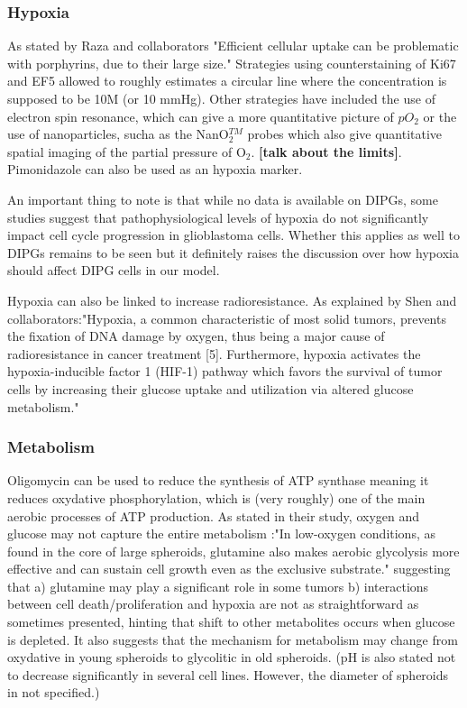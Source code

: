 \documentclass[11pt,a4paper]{article}
\begin{document}
\subsubsection{Hypoxia}
As stated by Raza and collaborators "Efficient cellular uptake can be problematic with porphyrins, due to their large size."\cite{Raza2017} Strategies using counterstaining of Ki67 and EF5 allowed to roughly estimates a circular line where the concentration is supposed to be 10\textmu M (or 10 mmHg)\cite{Grimes2014}\cite{Mao2018}. Other strategies have included the use of electron spin resonance\cite{Hashem2015}, which can give a more quantitative picture of $pO_2$ or the use of nanoparticles, sucha as the NanO$_2^{TM}$ probes which also give quantitative spatial imaging of the partial pressure of O$_2$.\cite{Dmitriev2014} \textbf{[talk about the limits]}. Pimonidazole can also be used  as an hypoxia marker. \cite{Onozato2017}

An important thing to note is that while no data is available on DIPGs, some studies suggest that pathophysiological levels of hypoxia do not significantly impact cell cycle progression in glioblastoma cells. Whether this applies as well to DIPGs remains to be seen but it definitely raises the discussion over how hypoxia should affect DIPG cells in our model.

Hypoxia can also be linked to increase radioresistance. As explained by Shen and collaborators:"Hypoxia, a common characteristic of most solid tumors, prevents the fixation of DNA damage by oxygen, thus being a major cause of radioresistance in cancer treatment [5]. Furthermore, hypoxia activates the hypoxia-inducible factor 1 (HIF-1) pathway which favors the survival of tumor cells by increasing their glucose uptake and utilization via altered glucose metabolism."\cite{Shen2020}

\subsubsection{Metabolism}
Oligomycin can be used to reduce the synthesis of ATP synthase meaning it reduces oxydative phosphorylation, which is (very roughly) one of the main aerobic processes of ATP production.\cite{Tidwell2022} As stated  in their study, oxygen and glucose may not capture the entire metabolism :"In low-oxygen conditions, as found in the core of large spheroids, glutamine also makes aerobic glycolysis more effective and can sustain cell growth even as the exclusive substrate." suggesting that a) glutamine may play a significant role in some tumors b) interactions between cell death/proliferation and hypoxia are not as straightforward as sometimes presented, hinting that shift to other metabolites occurs when glucose is depleted.\cite{Damiani2017}\cite{Rodriguez2008} It also suggests that the mechanism for metabolism may change from oxydative in young spheroids to glycolitic in old spheroids. \cite{Rodriguez2008} (pH is also stated not to decrease significantly in several cell lines. However, the diameter of spheroids in not specified.)
\end{document}
